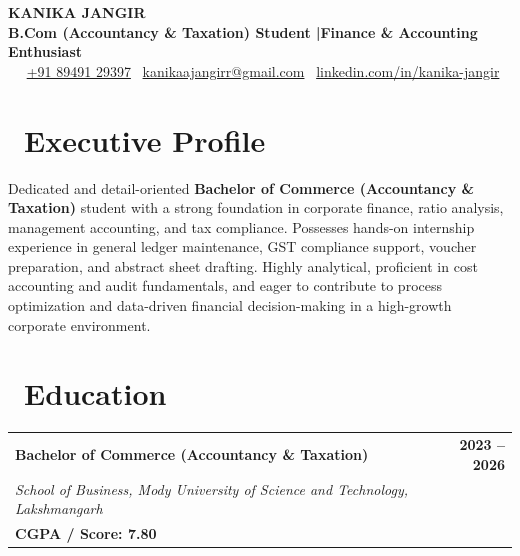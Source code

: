 \documentclass[a4paper,10pt]{article}
\begin{document}
\begin{center}
    {\Huge \textbf{\color{primary} KANIKA JANGIR}}\\[4pt]
    {\selectfont \color{secondary}\small \textbf{B.Com (Accountancy \& Taxation) Student \quad|\quad Finance \& Accounting Enthusiast}}\\[6pt]
    
    \small \color{darktext}
    \faMapMarker* \  \quad \bullet \quad
    \faPhone* \ \href{tel:+918949129397}{+91 89491 29397} \quad \bullet \quad
    \faEnvelope \ \href{mailto:kanikaajangirr@gmail.com}{kanikaajangirr@gmail.com} \quad \bullet \quad
    \faLinkedin \ \href{https://linkedin.com/in/kanika-jangir}{linkedin.com/in/kanika-jangir}
\end{center}

\vspace{-6pt}

\section*{\faUser \ Executive Profile}
Dedicated and detail-oriented \textbf{Bachelor of Commerce (Accountancy \& Taxation)} student with a strong foundation in corporate finance, ratio analysis, management accounting, and tax compliance. Possesses hands-on internship experience in general ledger maintenance, GST compliance support, voucher preparation, and abstract sheet drafting. Highly analytical, proficient in cost accounting and audit fundamentals, and eager to contribute to process optimization and data-driven financial decision-making in a high-growth corporate environment.

\section*{\faGraduationCap \ Education}

\begin{tabularx}{\textwidth}{@{}X r@{}}
    \textbf{\color{primary} Bachelor of Commerce (Accountancy \& Taxation)} & \textbf{2023 -- 2026} \\
    \textit{School of Business, Mody University of Science and Technology, Lakshmangarh} & \\
    \textbf{CGPA / Score: 7.80} & \\
\end{tabularx}
\end{document}
